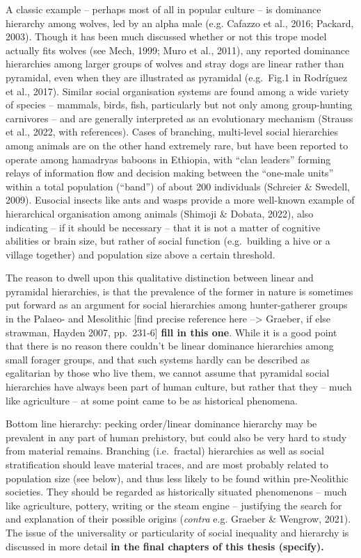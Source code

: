 \documentclass[
  12pt,
]{book}
\begin{document}
A classic example -- perhaps most of all in popular culture -- is dominance hierarchy among wolves, led by an alpha male (e.g. Cafazzo et al., 2016; Packard, 2003). Though it has been much discussed whether or not this trope model actually fits wolves (see Mech, 1999; Muro et al., 2011), any reported dominance hierarchies among larger groups of wolves and stray dogs are linear rather than pyramidal, even when they are illustrated as pyramidal (e.g.~Fig.1 in Rodríguez et al., 2017). Similar social organisation systems are found among a wide variety of species -- mammals, birds, fish, particularly but not only among group-hunting carnivores -- and are generally interpreted as an evolutionary mechanism (Strauss et al., 2022, with references). Cases of branching, multi-level social hierarchies among animals are on the other hand extremely rare, but have been reported to operate among hamadryas baboons in Ethiopia, with ``clan leaders'' forming relays of information flow and decision making between the ``one-male units'' within a total population (``band'') of about 200 individuals (Schreier \& Swedell, 2009). Eusocial insects like ants and wasps provide a more well-known example of hierarchical organisation among animals (Shimoji \& Dobata, 2022), also indicating -- if it should be necessary -- that it is not a matter of cognitive abilities or brain size, but rather of social function (e.g.~building a hive or a village together) and population size above a certain threshold.

The reason to dwell upon this qualitative distinction between linear and pyramidal hierarchies, is that the prevalence of the former in nature is sometimes put forward as an argument for social hierarchies among hunter-gatherer groups in the Palaeo- and Mesolithic {[}find precise reference here --\textgreater{} Graeber, if else strawman, Hayden 2007, pp.~231-6{]} \textbf{fill in this one}. While it is a good point that there is no reason there couldn't be linear dominance hierarchies among small forager groups, and that such systems hardly can be described as egalitarian by those who live them, we cannot assume that pyramidal social hierarchies have always been part of human culture, but rather that they -- much like agriculture -- at some point came to be as historical phenomena.

Bottom line hierarchy: pecking order/linear dominance hierarchy may be prevalent in any part of human prehistory, but could also be very hard to study from material remains. Branching (i.e.~fractal) hierarchies as well as social stratification should leave material traces, and are most probably related to population size (see below), and thus less likely to be found within pre-Neolithic societies. They should be regarded as historically situated phenomenons -- much like agriculture, pottery, writing or the steam engine -- justifying the search for and explanation of their possible origins (\emph{contra} e.g. Graeber \& Wengrow, 2021). The issue of the universality or particularity of social inequality and hierarchy is discussed in more detail \textbf{in the final chapters of this thesis (specify).}
\end{document}
